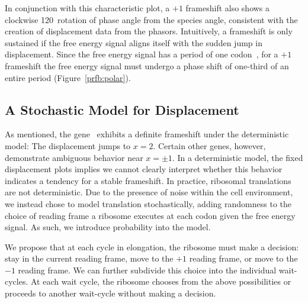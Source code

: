 \documentclass[12pt, draft]{article}
\numberwithin{equation}{section}
\begin{document}
In conjunction with this characteristic plot, a $+1$ frameshift also shows a clockwise 120\degree\
rotation of phase angle from the species angle, consistent with the creation of displacement data from the phasors.
Intuitively, a frameshift is only sustained if the free energy signal aligns itself with the sudden jump in displacement.
Since the free energy signal has a period of one codon~\cite{lalit:mechanics}, for a $+1$ frameshift the free energy signal
must undergo a phase shift of one-third of an entire period (Figure~\ref{prfb:polar}).

\subsection{A Stochastic Model for Displacement}
\label{stochastic}


As mentioned, the gene \prfB\ exhibits a definite frameshift under the deterministic model: The displacement jumps to $x=2$.
Certain other genes, however, demonstrate ambiguous behavior near $x = \pm 1$.
In a deterministic model, the fixed displacement plots implies
we cannot clearly interpret whether this behavior indicates a tendency for a stable frameshift.
In practice, ribosomal translations are not deterministic. Due to the presence of
noise within the cell environment, we instead chose to model translation stochastically, adding
randomness to the choice of reading frame a ribosome executes at each codon given the free energy signal.
As such, we introduce probability into the model.

We propose that at each cycle in elongation, the ribosome must make a decision: stay in the current reading frame,
move to the $+1$ reading frame,
or move to the $-1$ reading frame.  We can further subdivide this choice into the individual wait-cycles.
At each wait cycle, the ribosome chooses from the above possibilities or proceeds to another wait-cycle without making a decision.
\end{document}
